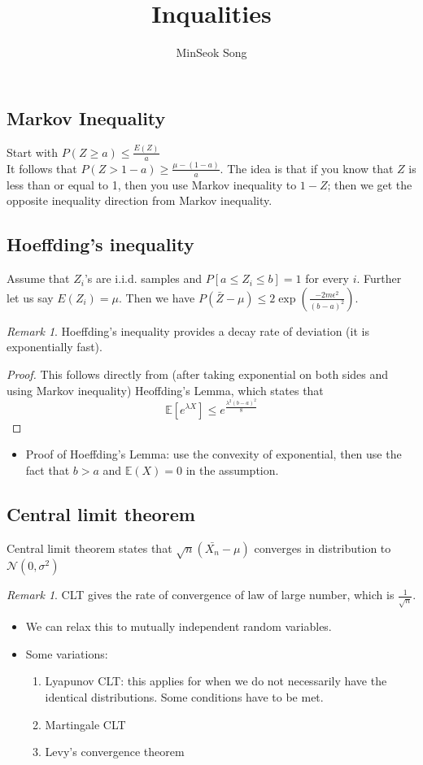 \documentclass[11pt,reqno]{amsart}
\title{Inqualities}
\author{MinSeok Song}
\date{}
\theoremstyle{remark}
\newtheorem{remark}[example]{Remark}
\begin{document}
\maketitle
\subsection*{Markov Inequality}
Start with $P(Z\geq a)\leq \frac{E(Z)}a$\\
It follows that $P(Z>1-a)\geq \frac{\mu-(1-a)}a$. The idea is that if you know that $Z$ is less than or equal to 1, then you use Markov inequality to $1-Z$; then we get the opposite inequality direction from Markov inequality. 

\subsection*{Hoeffding's inequality}
Assume that $Z_i$'s are i.i.d. samples and $P[a\leq Z_i\leq b]=1$ for every $i$. Further let us say $E(Z_i)=\mu$. Then we have $P(\bar Z-\mu)\leq 2\exp(\frac{-2m\epsilon^2}{(b-a)^2})$.
\begin{remark}
Hoeffding's inequality provides a decay rate of deviation (it is exponentially fast). 
\end{remark}
\begin{proof}
This follows directly from (after taking exponential on both sides and using Markov inequality) Heoffding's Lemma, which states that
\[
\mathbb{E}[e^{\lambda X}]\leq e^{\frac{\lambda^2(b-a)^2}8}
\]
\end{proof}
\begin{itemize}
\item Proof of Hoeffding's Lemma: use the convexity of exponential, then use the fact that $b>a$ and $\mathbb{E}(X)=0$ in the assumption.
\end{itemize}

\subsection*{Central limit theorem}
Central limit theorem states that $\sqrt n(\bar{X_n}-\mu)$ converges in distribution to $\mathcal{N}(0,\sigma^2)$
\begin{remark}
CLT gives the rate of convergence of law of large number, which is $\frac{1}{\sqrt{n}}$.
\end{remark}
\begin{itemize}
\item We can relax this to mutually independent random variables. 
\item Some variations:
\begin{enumerate}
\item Lyapunov CLT: this applies for when we do not necessarily have the identical distributions.
 Some conditions have to be met.
\item Martingale CLT
\item Levy's convergence theorem
\end{enumerate}
\end{itemize}
\end{document}
